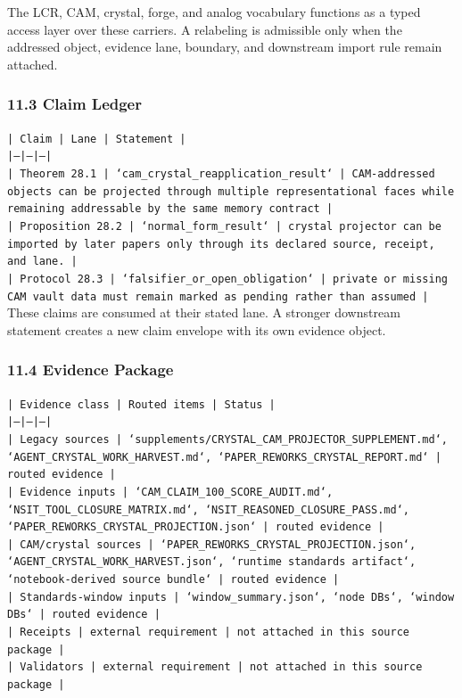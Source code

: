 \documentclass[11pt]{article}
\begin{document}
The LCR, CAM, crystal, forge, and analog vocabulary functions as a typed access
layer over these carriers. A relabeling is admissible only when the addressed
object, evidence lane, boundary, and downstream import rule remain attached.

\subsubsection*{11.3 Claim Ledger}

\noindent\texttt{| Claim | Lane | Statement |}\\
\noindent\texttt{|---|---|---|}\\
\noindent\texttt{| Theorem 28.1 | `cam\_crystal\_reapplication\_result` | CAM-addressed objects can be projected through multiple representational faces while remaining addressable by the same memory contract |}\\
\noindent\texttt{| Proposition 28.2 | `normal\_form\_result` | crystal projector can be imported by later papers only through its declared source, receipt, and lane. |}\\
\noindent\texttt{| Protocol 28.3 | `falsifier\_or\_open\_obligation` | private or missing CAM vault data must remain marked as pending rather than assumed |}\\

These claims are consumed at their stated lane. A stronger downstream statement
creates a new claim envelope with its own evidence object.

\subsubsection*{11.4 Evidence Package}

\noindent\texttt{| Evidence class | Routed items | Status |}\\
\noindent\texttt{|---|---|---|}\\
\noindent\texttt{| Legacy sources | `supplements/CRYSTAL\_CAM\_PROJECTOR\_SUPPLEMENT.md`, `AGENT\_CRYSTAL\_WORK\_HARVEST.md`, `PAPER\_REWORKS\_CRYSTAL\_REPORT.md` | routed evidence |}\\
\noindent\texttt{| Evidence inputs | `CAM\_CLAIM\_100\_SCORE\_AUDIT.md`, `NSIT\_TOOL\_CLOSURE\_MATRIX.md`, `NSIT\_REASONED\_CLOSURE\_PASS.md`, `PAPER\_REWORKS\_CRYSTAL\_PROJECTION.json` | routed evidence |}\\
\noindent\texttt{| CAM/crystal sources | `PAPER\_REWORKS\_CRYSTAL\_PROJECTION.json`, `AGENT\_CRYSTAL\_WORK\_HARVEST.json`, `runtime standards artifact`, `notebook-derived source bundle` | routed evidence |}\\
\noindent\texttt{| Standards-window inputs | `window\_summary.json`, `node DBs`, `window DBs` | routed evidence |}\\
\noindent\texttt{| Receipts | external requirement | not attached in this source package |}\\
\noindent\texttt{| Validators | external requirement | not attached in this source package |}\\
\end{document}
